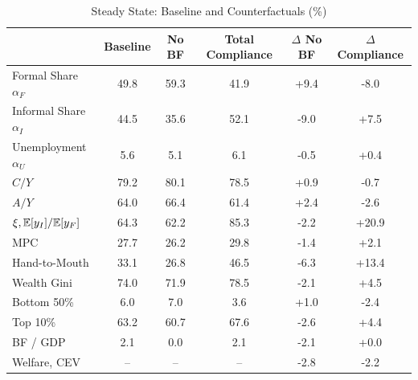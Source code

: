 \begin{table}[htbp]
\centering
\caption{Steady State: Baseline and Counterfactuals (\%)}
\label{tab:counterfactuals}
\small
\begin{tabular}{lccccc}
\toprule
 & Baseline & No BF & Total Compliance & $\Delta$ No BF & $\Delta$ Compliance \\
\midrule
Formal Share $\alpha_F$ & 49.8 & 59.3 & 41.9 & +9.4 & -8.0 \\
Informal Share $\alpha_I$ & 44.5 & 35.6 & 52.1 & -9.0 & +7.5 \\
Unemployment $\alpha_U$ & 5.6 & 5.1 & 6.1 & -0.5 & +0.4 \\
$C/Y$ & 79.2 & 80.1 & 78.5 & +0.9 & -0.7 \\
$A/Y$ & 64.0 & 66.4 & 61.4 & +2.4 & -2.6 \\
$\xi, \mathbb{E}[y_I]/\mathbb{E}[y_F]$ & 64.3 & 62.2 & 85.3 & -2.2 & +20.9 \\
MPC & 27.7 & 26.2 & 29.8 & -1.4 & +2.1 \\
Hand-to-Mouth & 33.1 & 26.8 & 46.5 & -6.3 & +13.4 \\
Wealth Gini & 74.0 & 71.9 & 78.5 & -2.1 & +4.5 \\
Bottom 50\% & 6.0 & 7.0 & 3.6 & +1.0 & -2.4 \\
Top 10\% & 63.2 & 60.7 & 67.6 & -2.6 & +4.4 \\
BF / GDP & 2.1 & 0.0 & 2.1 & -2.1 & +0.0 \\
Welfare, CEV & -- & -- & -- & -2.8 & -2.2 \\
\bottomrule
\end{tabular}
\end{table}
